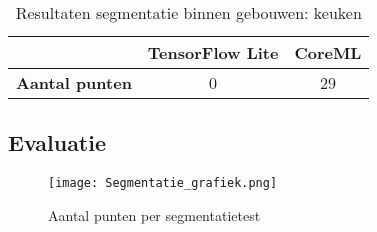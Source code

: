 \begin{table}[H]
	\centering
	\begin{tabular}{|c|c|c|}
		\hline
		& \textbf{TensorFlow Lite} & \textbf{CoreML} \\ \hline
		\textbf{Aantal punten} & 0                        & 29              \\ \hline
	\end{tabular}
	\caption{Resultaten segmentatie binnen gebouwen: keuken}
\end{table}

\subsection{Evaluatie}
\begin{figure}[H]
	\centering
	\texttt{[image: Segmentatie\_grafiek.png]}
	\caption{Aantal punten per segmentatietest}
\end{figure}



